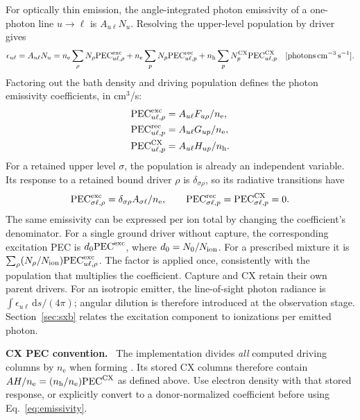 \documentclass[11pt,a4paper]{article}
\newcommand{\code}[1]{\texttt{\detokenize{#1}}}
\newcommand{\dd}{\mathrm{d}}
\newcommand{\nelec}{n_{\mathrm e}}
\newcommand{\nh}{n_{\mathrm h}}
\newenvironment{implnote}[1][Implementation]{%
  \par\smallskip\noindent\begin{lrbox}{\notebox}\setlength{\fboxsep}{6pt}\begin{minipage}{\dimexpr\linewidth-2\fboxsep-2\fboxrule\relax}\small\textbf{#1.}\ }{%
  \end{minipage}\end{lrbox}\setlength{\fboxsep}{6pt}\fcolorbox{noteframe}{notebg}{\usebox{\notebox}}\par\smallskip}
\numberwithin{equation}{section}
\begin{document}
For optically thin emission, the angle-integrated photon emissivity
of a one-photon line $u\to\ell$ is $A_{u\ell}N_u$. Resolving the
upper-level population by driver gives
\begin{equation}\label{eq:emissivity}
 \epsilon_{u\ell}=A_{u\ell}N_u
 =\nelec\sum_\rho N_\rho\mathrm{PEC}^{\rm exc}_{u\ell,\rho}
  +\nelec\sum_pN_p\mathrm{PEC}^{\rm rec}_{u\ell,p}
  +\nh\sum_pN_p^{\rm CX}\mathrm{PEC}^{\rm CX}_{u\ell,p}
 \quad[\mathrm{photons}\,\mathrm{cm}^{-3}\,\mathrm{s}^{-1}].
\end{equation}
Factoring out the bath density and driving population defines the
photon emissivity coefficients, in cm$^3$/s:
\begin{align}
 \mathrm{PEC}^{\rm exc}_{u\ell,\rho}&=A_{u\ell}F_{u\rho}/\nelec,\label{eq:pec-exc}\\
 \mathrm{PEC}^{\rm rec}_{u\ell,p}&=A_{u\ell}G_{up}/\nelec,\label{eq:pec-rec}\\
 \mathrm{PEC}^{\rm CX}_{u\ell,p}&=A_{u\ell}H_{up}/\nh.\label{eq:pec-cx}
\end{align}
For a retained upper level $\sigma$, the population is already an
independent variable. Its response to a retained bound driver $\rho$
is $\delta_{\sigma\rho}$, so its radiative transitions have
\begin{equation}\label{eq:pec-meta}
 \mathrm{PEC}^{\rm exc}_{\sigma\ell,\rho}=\delta_{\sigma\rho}A_{\sigma\ell}/\nelec,
 \qquad
 \mathrm{PEC}^{\rm rec}_{\sigma\ell,p}=\mathrm{PEC}^{\rm CX}_{\sigma\ell,p}=0.
\end{equation}
The same emissivity can be expressed per ion total by changing the
coefficient's denominator. For a single ground driver without capture,
the corresponding excitation PEC is $d_0\mathrm{PEC}^{\rm exc}$,
where $d_0=N_0/N_{\rm ion}$. For a prescribed mixture it is
$\sum_\rho(N_\rho/N_{\rm ion})\mathrm{PEC}^{\rm exc}_{u\ell,\rho}$.
The factor is applied once, consistently with the population that
multiplies the coefficient. Capture and CX retain their own parent
drivers. For an isotropic emitter, the line-of-sight photon radiance
is $\int\epsilon_{u\ell}\,\dd s/(4\pi)$; angular dilution is therefore
introduced at the observation stage. Section~\ref{sec:sxb} relates the
excitation component to ionizations per emitted photon.

\begin{implnote}[CX PEC convention]
The implementation divides \emph{all} computed driving columns by $\nelec$ when forming
\code{processed['pecs']}. Its stored CX columns therefore contain
$A H/\nelec=(\nh/\nelec)\mathrm{PEC}^{\rm CX}$ as defined above.
Use electron density with that stored response, or explicitly convert to a
donor-normalized coefficient before using Eq.~\eqref{eq:emissivity}.
\end{implnote}
\end{document}
